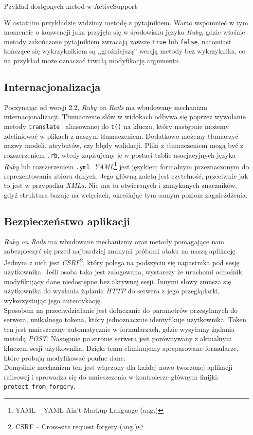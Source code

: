 \documentclass[12pt,twoside]{report}
\begin{document}
\begin{listing}
  
  \caption{Pzykład dostępnych metod w ActiveSupport}
  \label{listing:activesupport}
\end{listing}


W ostatnim przykładzie widzimy metodę z pytajnikiem. Warto wspomnieć w tym
momencie o konwencji jaka przyjęła się w środowisku języka \emph{Ruby}, gdzie
właśnie metody zakończone pytajnikiem zwracają zawsze \texttt{true} lub
\texttt{false}, natomiast kończące się wykrzyknikiem są ,,groźniejszą'' wersją metody
bez wykrzyknika, co na przykład może oznaczać trwałą modyfikację argumentu.

\subsection{Internacjonalizacja}
Poczynając od wersji 2.2, \emph{Ruby on Rails} ma wbudowany mechanizm internacjonalizacji.
Tłumaczenie słów w widokach odbywa się poprzez wywołanie metody \texttt{translate
} aliasowanej do \texttt{t()} na kluczu, który następnie możemy zdefiniować w plikach z
naszym tłumaczeniem. Dodatkowo możemy tłumaczyć nazwy modeli, atrybutów, czy błędy
walidacji. Pliki z tłumaczeniem mogą być z rozszerzeniem \texttt{.rb}, wtedy zapisujemy je
w postaci tablic asocjacyjnych języka \emph{Ruby} lub rozszerzeniem \texttt{.yml}.
\emph{YAML}\footnote{YAML -- YAML Ain't Markup Language (ang.)} jest językiem formalnym
przeznaczonym do reprezentowania zbioru danych. Jego główną zaletą jest czytelność,
przeciwnie jak to jest w przypadku \emph{XMLa}. Nie ma tu otwieranych i zamykanych
znaczników, gdyż struktura bazuje na wcięciach, określając tym samym poziom zagnieżdżenia.


\subsection{Bezpieczeństwo aplikacji}
\emph{Ruby on Rails} ma wbudowane mechanizmy oraz metody pomagające nam zabezpieczyć się
przed najbardziej znanymi próbami ataku na naszą aplikację. Jednym z nich jest
\emph{CSRF}\footnote{CSRF -- Cross-site request forgery (ang.)}, który polega na podszyciu się
napastnika pod sesję użytkownika. Jeśli osoba taka jest zalogowana, wystarczy że uruchomi
odnośnik modyfikujący dane niedostępne bez aktywnej sesji. Innymi słowy zmusza się
użytkownika do wysłania żądania \emph{HTTP} do serwera z jego przeglądarki, wykorzystując
jego autentykację.\\
Sposobem na przeciwdziałanie jest dołączanie do parametrów przesyłanych do serwera,
unikalnego tokena, który jednoznacznie identyfikuje użytkownika. Token ten jest umieszczany
automatycznie w formularzach, gdzie wysyłamy żądania metodą \emph{POST}. Następnie po
stronie serwera jest porównywany z aktualnym kluczem sesji użytkownika. Dzięki temu
eliminujemy spreparowane formularze, które próbują modyfikować poufne dane.\\
Domyślnie mechanizm ten jest włączony dla każdej nowo tworzonej aplikacji railsowej i
sprowadza się do umieszczenia w kontrolerze głównym linijki: \texttt{protect\_from\_forgery}.
\end{document}
